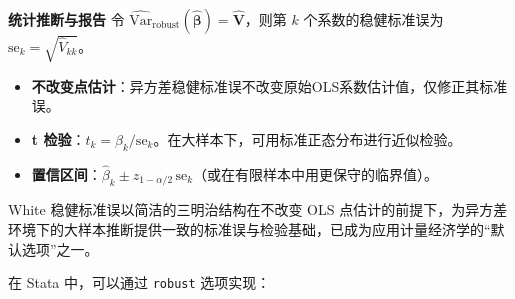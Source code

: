 \textbf{统计推断与报告}
令 $\widehat{\mathrm{Var}}_{\mathrm{robust}}(\hat{\bm{\beta}})=\hat{\bm{V}}$，则第 $k$ 个系数的稳健标准误为 $\mathrm{se}_k=\sqrt{\hat V_{kk}}$。
\begin{itemize}
  \item \textbf{不改变点估计}：异方差稳健标准误不改变原始OLS系数估计值，仅修正其标准误。
  \item \textbf{t 检验}：$t_k=\hat\beta_k/\mathrm{se}_k$。在大样本下，可用标准正态分布进行近似检验。
  \item \textbf{置信区间}：$\hat\beta_k \pm z_{1-\alpha/2}\,\mathrm{se}_k$（或在有限样本中用更保守的临界值）。
\end{itemize}
White 稳健标准误以简洁的三明治结构在不改变 OLS 点估计的前提下，为异方差环境下的大样本推断提供一致的标准误与检验基础，已成为应用计量经济学的“默认选项”之一。

在 Stata 中，可以通过 \texttt{robust} 选项实现：

